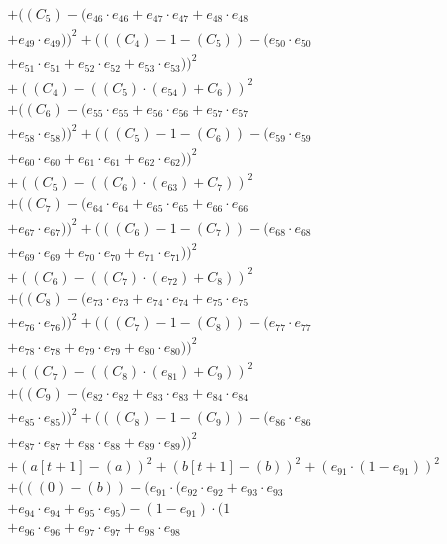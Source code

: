 \documentclass[10pt, a4paper]{article}
\begin{document}
\begin{align*}
& + ((C_{5}) - (e_{46} \cdot e_{46} + e_{47} \cdot e_{47} + e_{48} \cdot e_{48} \\
& + e_{49} \cdot e_{49}))^{2} + (((C_{4}) - 1 - (C_{5})) - (e_{50} \cdot e_{50} \\
& + e_{51} \cdot e_{51} + e_{52} \cdot e_{52} + e_{53} \cdot e_{53}))^{2} \\
& + ((C_{4}) - ((C_{5})  \cdot  (e_{54}) + C_{6}))^{2} \\
& + ((C_{6}) - (e_{55} \cdot e_{55} + e_{56} \cdot e_{56} + e_{57} \cdot e_{57} \\
& + e_{58} \cdot e_{58}))^{2} + (((C_{5}) - 1 - (C_{6})) - (e_{59} \cdot e_{59} \\
& + e_{60} \cdot e_{60} + e_{61} \cdot e_{61} + e_{62} \cdot e_{62}))^{2} \\
& + ((C_{5}) - ((C_{6})  \cdot  (e_{63}) + C_{7}))^{2} \\
& + ((C_{7}) - (e_{64} \cdot e_{64} + e_{65} \cdot e_{65} + e_{66} \cdot e_{66} \\
& + e_{67} \cdot e_{67}))^{2} + (((C_{6}) - 1 - (C_{7})) - (e_{68} \cdot e_{68} \\
& + e_{69} \cdot e_{69} + e_{70} \cdot e_{70} + e_{71} \cdot e_{71}))^{2} \\
& + ((C_{6}) - ((C_{7})  \cdot  (e_{72}) + C_{8}))^{2} \\
& + ((C_{8}) - (e_{73} \cdot e_{73} + e_{74} \cdot e_{74} + e_{75} \cdot e_{75} \\
& + e_{76} \cdot e_{76}))^{2} + (((C_{7}) - 1 - (C_{8})) - (e_{77} \cdot e_{77} \\
& + e_{78} \cdot e_{78} + e_{79} \cdot e_{79} + e_{80} \cdot e_{80}))^{2} \\
& + ((C_{7}) - ((C_{8})  \cdot  (e_{81}) + C_{9}))^{2} \\
& + ((C_{9}) - (e_{82} \cdot e_{82} + e_{83} \cdot e_{83} + e_{84} \cdot e_{84} \\
& + e_{85} \cdot e_{85}))^{2} + (((C_{8}) - 1 - (C_{9})) - (e_{86} \cdot e_{86} \\
& + e_{87} \cdot e_{87} + e_{88} \cdot e_{88} + e_{89} \cdot e_{89}))^{2} \\
& + (a[t+1] - (a))^{2} + (b[t+1] - (b))^{2} + (e_{91} \cdot (1 - e_{91}))^{2} \\
& + (((0) - (b)) - (e_{91} \cdot (e_{92} \cdot e_{92} + e_{93} \cdot e_{93} \\
& + e_{94} \cdot e_{94} + e_{95} \cdot e_{95}) - (1 - e_{91}) \cdot (1 \\
& + e_{96} \cdot e_{96} + e_{97} \cdot e_{97} + e_{98} \cdot e_{98} \\

\end{align*}
\end{document}
